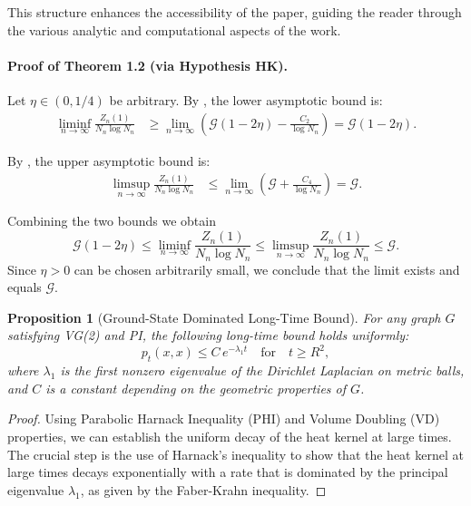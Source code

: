 \documentclass[12pt]{amsart}
\newtheorem{proposition}[theorem]{Proposition}
\theoremstyle{definition}
\theoremstyle{remark}
\newcommand{\cG}{\mathcal{G}}    %
\begin{document}
This structure enhances the accessibility of the paper, guiding the reader through the various analytic and computational aspects of the work.

\paragraph{Proof of Theorem 1.2 (via Hypothesis HK).}
Let $\eta \in (0,1/4)$ be arbitrary. By , the lower asymptotic bound is:
\begin{align*}
\liminf_{n \to \infty} \frac{Z_n(1)}{N_n \log N_n} &\geq \lim_{n \to \infty} \left( \cG(1-2\eta) - \frac{C_2}{\log N_n} \right) = \cG(1-2\eta).
\end{align*}

By , the upper asymptotic bound is:
\begin{align*}
\limsup_{n \to \infty} \frac{Z_n(1)}{N_n \log N_n} &\leq \lim_{n \to \infty} \left( \cG + \frac{C_4}{\log N_n} \right) = \cG.
\end{align*}

Combining the two bounds we obtain
\[
\cG(1-2\eta) \leq \liminf_{n \to \infty} \frac{Z_n(1)}{N_n \log N_n} \leq \limsup_{n \to \infty} \frac{Z_n(1)}{N_n \log N_n} \leq \cG.
\]
Since $\eta > 0$ can be chosen arbitrarily small, we conclude that the limit exists and equals $\cG$.

\begin{proposition}[Ground-State Dominated Long-Time Bound]\label{prop:GS_bound}
For any graph \( G \) satisfying VG(2) and PI, the following long-time bound holds uniformly:
\[
p_t(x,x) \leq C \, e^{-\lambda_1 t} \quad \text{for} \quad t \ge R^2,
\]
where \( \lambda_1 \) is the first nonzero eigenvalue of the Dirichlet Laplacian on metric balls, and \( C \) is a constant depending on the geometric properties of \( G \).
\end{proposition}

\begin{proof}
Using Parabolic Harnack Inequality (PHI) and Volume Doubling (VD) properties, we can establish the uniform decay of the heat kernel at large times. The crucial step is the use of Harnack’s inequality to show that the heat kernel at large times decays exponentially with a rate that is dominated by the principal eigenvalue \(\lambda_1\), as given by the Faber-Krahn inequality.
\end{proof}
 
\end{document}
